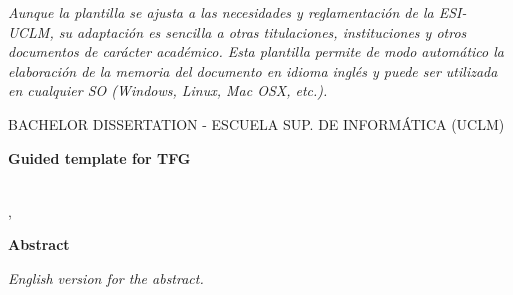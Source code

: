 \emph{Aunque la plantilla se ajusta a las necesidades y reglamentación de la ESI-UCLM, su adaptación es sencilla a otras titulaciones, instituciones y otros documentos de carácter académico. Esta plantilla permite de modo automático la elaboración de la memoria del documento en idioma inglés y puede ser utilizada en cualquier SO (Windows, Linux, Mac OSX, etc.).}


\cleardoublepage %





\makeatletter
\begin{center} %
   {\textsc{BACHELOR DISSERTATION - ESCUELA SUP. DE INFORMÁTICA (UCLM)}\par}
   \vspace{1cm} %
   {\textbf{\Large Guided template for TFG}\par}
   \vspace{0.4cm} %
   {\@autor \\ \@cityTF,{} \@monthTF{} \@yearTF\par} 
   \vspace{0.9cm} %
   {\textbf{\large\textsf{Abstract}}\par} 
\end{center}   
\makeatother %
\emph{English version for the abstract.}
\cleardoublepage %

